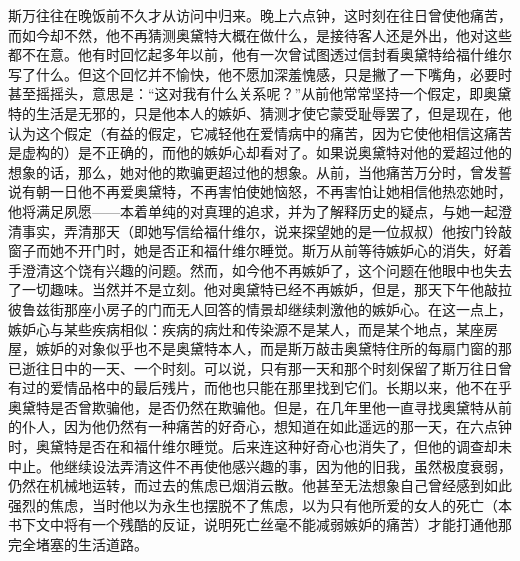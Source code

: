 \par 斯万往往在晚饭前不久才从访问中归来。晚上六点钟，这时刻在往日曾使他痛苦，而如今却不然，他不再猜测奥黛特大概在做什么，是接待客人还是外出，他对这些都不在意。他有时回忆起多年以前，他有一次曾试图透过信封看奥黛特给福什维尔写了什么。但这个回忆并不愉快，他不愿加深羞愧感，只是撇了一下嘴角，必要时甚至摇摇头，意思是：“这对我有什么关系呢？”从前他常常坚持一个假定，即奥黛特的生活是无邪的，只是他本人的嫉妒、猜测才使它蒙受耻辱罢了，但是现在，他认为这个假定（有益的假定，它减轻他在爱情病中的痛苦，因为它使他相信这痛苦是虚构的）是不正确的，而他的嫉妒心却看对了。如果说奥黛特对他的爱超过他的想象的话，那么，她对他的欺骗更超过他的想象。从前，当他痛苦万分时，曾发誓说有朝一日他不再爱奥黛特，不再害怕使她恼怒，不再害怕让她相信他热恋她时，他将满足夙愿——本着单纯的对真理的追求，并为了解释历史的疑点，与她一起澄清事实，弄清那天（即她写信给福什维尔，说来探望她的是一位叔叔）他按门铃敲窗子而她不开门时，她是否正和福什维尔睡觉。斯万从前等待嫉妒心的消失，好着手澄清这个饶有兴趣的问题。然而，如今他不再嫉妒了，这个问题在他眼中也失去了一切趣味。当然并不是立刻。他对奥黛特已经不再嫉妒，但是，那天下午他敲拉彼鲁兹街那座小房子的门而无人回答的情景却继续刺激他的嫉妒心。在这一点上，嫉妒心与某些疾病相似：疾病的病灶和传染源不是某人，而是某个地点，某座房屋，嫉妒的对象似乎也不是奥黛特本人，而是斯万敲击奥黛特住所的每扇门窗的那已逝往日中的一天、一个时刻。可以说，只有那一天和那个时刻保留了斯万往日曾有过的爱情品格中的最后残片，而他也只能在那里找到它们。长期以来，他不在乎奥黛特是否曾欺骗他，是否仍然在欺骗他。但是，在几年里他一直寻找奥黛特从前的仆人，因为他仍然有一种痛苦的好奇心，想知道在如此遥远的那一天，在六点钟时，奥黛特是否在和福什维尔睡觉。后来连这种好奇心也消失了，但他的调查却未中止。他继续设法弄清这件不再使他感兴趣的事，因为他的旧我，虽然极度衰弱，仍然在机械地运转，而过去的焦虑已烟消云散。他甚至无法想象自己曾经感到如此强烈的焦虑，当时他以为永生也摆脱不了焦虑，以为只有他所爱的女人的死亡（本书下文中将有一个残酷的反证，说明死亡丝毫不能减弱嫉妒的痛苦）才能打通他那完全堵塞的生活道路。
